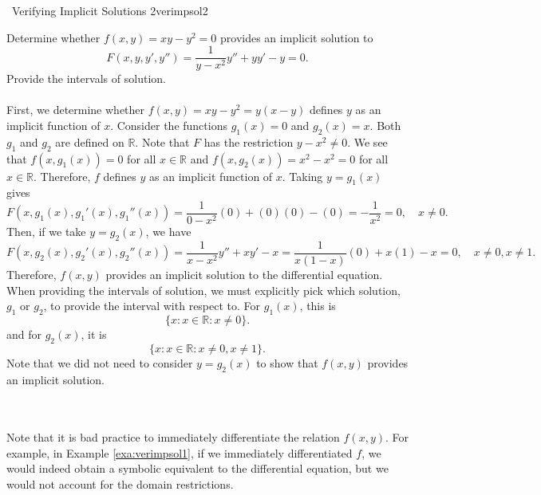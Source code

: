         \pagebreak
        \begin{example}{\Difficulty\,\Difficulty\,\,Verifying Implicit Solutions 2}{verimpsol2}
            
            Determine whether \(f(x,y)=xy-y^2=0\) provides an implicit solution to
            \begin{equation*}
                F(x,y,y',y'')=\frac{1}{y-x^2}y''+yy'-y=0.
            \end{equation*}
            Provide the intervals of solution.
            \\
            \\
            First, we determine whether \(f(x,y)=xy-y^2=y(x-y)\) defines \(y\) as an implicit function of \(x\). Consider the functions \(g_1(x)=0\) and \(g_2(x)=x\). Both \(g_1\) and \(g_2\) are defined on \(\mathbb{R}\). Note that \(F\) has the restriction \(y-x^2\neq0\). We see that \(f(x,g_1(x))=0\) for all \(x\in\mathbb{R}\) and \(f(x,g_2(x))=x^2-x^2=0\) for all \(x\in\mathbb{R}\). Therefore, \(f\) defines \(y\) as an implicit function of \(x\). Taking \(y=g_1(x)\) gives
            \begin{equation*}
                F(x,g_1(x),g_1'(x),g_1''(x))=\frac{1}{0-x^2}(0)+(0)(0)-(0)=-\frac{1}{x^2}=0,\quad x\neq0.
            \end{equation*}
            Then, if we take \(y=g_2(x)\), we have
            \begin{equation*}
                F(x,g_2(x),g_2'(x),g_2''(x))=\frac{1}{x-x^2}y''+xy'-x=\frac{1}{x(1-x)}(0)+x(1)-x=0, \quad x\neq 0,x\neq 1.
            \end{equation*}
            Therefore, \(f(x,y)\) provides an implicit solution to the differential equation. When providing the intervals of solution, we must explicitly pick which solution, \(g_1\) or \(g_2\), to provide the interval with respect to. For \(g_1(x)\), this is 
            \begin{equation*}
                \{x:x\in\mathbb{R}:x\neq0\}.
            \end{equation*}
            and for \(g_2(x)\), it is
            \begin{equation*}
                \{x:x\in\mathbb{R}:x\neq0,x\neq 1\}.
            \end{equation*}
            Note that we did not need to consider \(y=g_2(x)\) to show that \(f(x,y)\) provides an implicit solution.
        \end{example}
        \vphantom
        \\
        \\
        Note that it is bad practice to immediately differentiate the relation \(f(x,y)\). For example, in Example \ref{exa:verimpsol1}, if we immediately differentiated \(f\), we would indeed obtain a symbolic equivalent to the differential equation, but we would not account for the domain restrictions.

